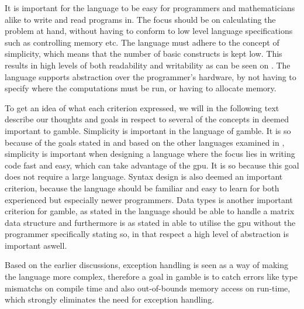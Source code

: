 It is important for the language to be easy for programmers and mathematicians alike to write and read programs in.
The focus should be on calculating the problem at hand, without having to conform to low level language specifications such as controlling memory etc.
The language must adhere to the concept of simplicity, which means that the number of basic constructs is kept low. 
This results in high levels of both readability and writability as can be seen on .
The language supports abstraction over the programmer's hardware, by not having to specify where the computations must be run, or having to allocate memory. 

To get an idea of what each criterion expressed, we will in the following text describe our thoughts and goals in respect to several of the concepts in  deemed important to \gls{gamble}.
Simplicity is important in the language of \gls{gamble}.
It is so because of the goals stated in  and based on the other languages examined in , simplicity is important when designing a language where the focus lies in writing code fast and easy, which can take advantage of the \acrshort{gpu}.
It is so because this goal does not require a large language. 
Syntax design is also deemed an important criterion, because the language should be familiar and easy to learn for both experienced but especially newer programmers.
Data types is another important criterion for \gls{gamble}, as stated in  the language should be able to handle a matrix data structure and furthermore is as stated in  able to utilise the \acrshort{gpu} without the programmer specifically stating so, in that respect a high level of abstraction is important aswell. 

Based on the earlier discussions, exception handling is seen as a way of making the language more complex, therefore a goal in \gls{gamble} is to catch errors like type mismatchs on compile time and also out-of-bounds memory access on run-time, which strongly eliminates the need for exception handling.


